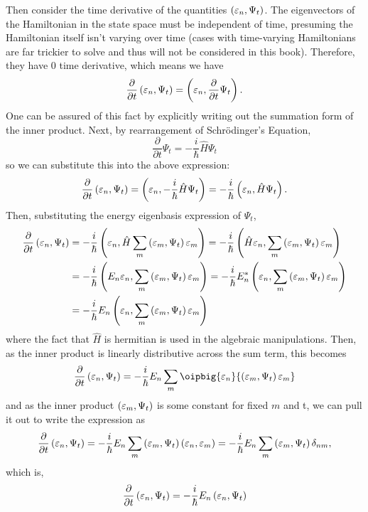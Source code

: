 Then consider the time derivative of the quantities $\left(\varepsilon_{n},\Psi_{t}\right)$. The eigenvectors of the Hamiltonian in the state space must be independent of time, presuming the Hamiltonian itself isn't varying over time (cases with time-varying Hamiltonians are far trickier to solve and thus will not be considered in this book). Therefore, they have 0 time derivative, which means we have
$$
\frac{\partial}{\partial t}\left(\varepsilon_{n},\Psi_{t}\right)=\left(\varepsilon_{n},\frac{\partial}{\partial t}\Psi_{t}\right).
$$
One can be assured of this fact by explicitly writing out the summation form of the inner product. Next, by rearrangement of Schr\"{o}dinger's Equation, 
$$
\frac{\partial}{\partial t}\Psi_{t}=-\frac{i}{\hbar}\hat{H}\Psi_{t}
$$
so we can substitute this into the above expression:
$$
\frac{\partial}{\partial t}\left(\varepsilon_{n},\Psi_{t}\right)=\left(\varepsilon_{n},-\frac{i}{\hbar}\hat{H}\Psi_{t}\right)=-\frac{i}{\hbar}\left(\varepsilon_{n},\hat{H}\Psi_{t}\right).
$$ 
Then, substituting the energy eigenbasis expression of $\Psi_{t}$,
$$
\begin{aligned}
\frac{\partial}{\partial t}\left(\varepsilon_{n},\Psi_{t}\right)&=-\frac{i}{\hbar}\left(\varepsilon_{n},\hat{H}\sum_{m}\left(\varepsilon_{m},\Psi_{t}\right)\varepsilon_{m}\right) =-\frac{i}{\hbar}\left(\hat{H}\varepsilon_{n},\sum_{m}\left(\varepsilon_{m},\Psi_{t}\right)\varepsilon_{m}\right)\\
&=-\frac{i}{\hbar}\left(E_{n}\varepsilon_{n},\sum_{m}\left(\varepsilon_{m},\Psi_{t}\right)\varepsilon_{m}\right)
=-\frac{i}{\hbar}E^{\ast}_{n}\left(\varepsilon_{n},\sum_{m}\left(\varepsilon_{m},\Psi_{t}\right)\varepsilon_{m}\right)\\
&=-\frac{i}{\hbar}E_{n}\left(\varepsilon_{n},\sum_{m}\left(\varepsilon_{m},\Psi_{t}\right)\varepsilon_{m}\right)
\end{aligned}
$$
where the fact that $\hat{H}$ is hermitian is used in the algebraic manipulations. Then, as the inner product is linearly distributive across the sum term, this becomes
$$
\frac{\partial}{\partial t}\oip{\varepsilon_{n}}{\Psi_{t}}=-\frac{i}{\hbar}E_{n}\sum_{m}\oipbig{\varepsilon_{n}}{\oip{\varepsilon_{m}}{\Psi_{t}}\varepsilon_{m}}
$$
and as the inner product $\left(\varepsilon_{m},\Psi_{t}\right)$ is some constant for fixed $m$ and t, we can pull it out to write the expression as
$$
\frac{\partial}{\partial t}\left(\varepsilon_{n},\Psi_{t}\right)=-\frac{i}{\hbar}E_{n}\sum_{m}\left(\varepsilon_{m},\Psi_{t}\right)\left(\varepsilon_{n},\varepsilon_{m}\right)=-\frac{i}{\hbar}E_{n}\sum_{m}\left(\varepsilon_{m},\Psi_{t}\right)\delta_{nm},
$$
which is,
$$
\frac{\partial}{\partial t}\left(\varepsilon_{n},\Psi_{t}\right)=-\frac{i}{\hbar}E_{n}\left(\varepsilon_{n},\Psi_{t}\right)
$$
